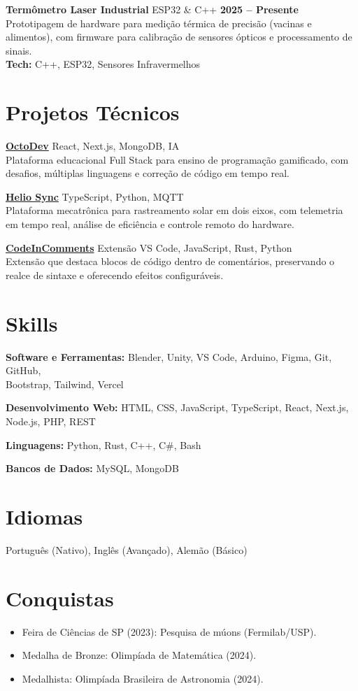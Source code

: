 \documentclass[10pt,a4paper]{article}
\begin{document}
\textbf{Termômetro Laser Industrial} \textbar{} ESP32 \& C++ \hfill \textbf{2025 -- Presente}\\
Prototipagem de hardware para medição térmica de precisão (vacinas e alimentos), com firmware para calibração de sensores ópticos e processamento de sinais.\\
\textbf{Tech:} C++, ESP32, Sensores Infravermelhos


\section*{Projetos Técnicos}
\textbf{\href{https://octodev.vercel.app/}{OctoDev}} \textbar{} React, Next.js, MongoDB, IA\\
Plataforma educacional Full Stack para ensino de programação gamificado, com desafios, múltiplas linguagens e correção de código em tempo real.

\textbf{\href{https://helio-sync.vercel.app}{Helio Sync}} \textbar{} TypeScript, Python, MQTT\\
Plataforma mecatrônica para rastreamento solar em dois eixos, com telemetria em tempo real, análise de eficiência e controle remoto do hardware.

\textbf{\href{https://github.com/renanrod4/vscode-code-in-comments}{CodeInComments}} \textbar{} Extensão VS Code, JavaScript, Rust, Python\\
Extensão que destaca blocos de código dentro de comentários, preservando o realce de sintaxe e oferecendo efeitos configuráveis.

\section*{Skills}
\textbf{Software e Ferramentas:} Blender, Unity, VS Code, Arduino, Figma, Git, GitHub,\\
Bootstrap, Tailwind, Vercel

\textbf{Desenvolvimento Web:} HTML, CSS, JavaScript, TypeScript, React, Next.js, Node.js, PHP, REST

\textbf{Linguagens:} Python, Rust, C++, C\#, Bash

\textbf{Bancos de Dados:} MySQL, MongoDB

\section*{Idiomas}
Português (Nativo), Inglês (Avançado), Alemão (Básico)

\section*{Conquistas}
\begin{itemize}
  \item Feira de Ciências de SP (2023): Pesquisa de múons (Fermilab/USP).
  \item Medalha de Bronze: Olimpíada de Matemática (2024).
  \item Medalhista: Olimpíada Brasileira de Astronomia (2024).
\end{itemize}
\end{document}
